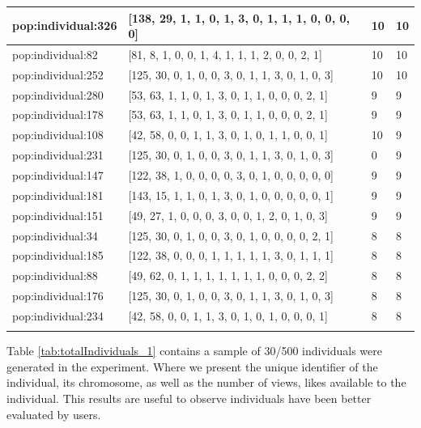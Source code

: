 \begin{table}
\begin{tabular}{p{3cm} p{4cm} p{3cm} p{3cm}}
\small{pop:individual:326} & \small{[138, 29, 1, 1, 0, 1, 3, 0, 1, 1, 1, 0, 0, 0, 0]}
& \small{10} & \small{10}\\ \hline
\small{pop:individual:82} & \small{[81, 8, 1, 0, 0, 1, 4, 1, 1, 1, 2, 0, 0, 2, 1]}
& \small{10} & \small{10}\\ \hline
\small{pop:individual:252} & \small{[125, 30, 0, 1, 0, 0, 3, 0, 1, 1, 3, 0, 1, 0, 3]}
& \small{10} & \small{10}\\ \hline
\small{pop:individual:280} & \small{[53, 63, 1, 1, 0, 1, 3, 0, 1, 1, 0, 0, 0, 2, 1]}
& \small{9} & \small{9}\\ \hline
\small{pop:individual:178} & \small{[53, 63, 1, 1, 0, 1, 3, 0, 1, 1, 0, 0, 0, 2, 1]}
& \small{9} & \small{9}\\ \hline
\small{pop:individual:108} & \small{[42, 58, 0, 0, 1, 1, 3, 0, 1, 0, 1, 1, 0, 0, 1]}
& \small{10} & \small{9}\\ \hline
\small{pop:individual:231} & \small{[125, 30, 0, 1, 0, 0, 3, 0, 1, 1, 3, 0, 1, 0, 3]}
& \small{0} & \small{9}\\ \hline
\small{pop:individual:147} & \small{[122, 38, 1, 0, 0, 0, 0, 3, 0, 1, 0, 0, 0, 0, 0]}
& \small{9} & \small{9}\\ \hline
\small{pop:individual:181} & \small{[143, 15, 1, 1, 0, 1, 3, 0, 1, 0, 0, 0, 0, 0, 1]}
& \small{9} & \small{9}\\ \hline
\small{pop:individual:151} & \small{[49, 27, 1, 0, 0, 0, 3, 0, 0, 1, 2, 0, 1, 0, 3]}
& \small{9} & \small{9}\\ \hline
\small{pop:individual:34} & \small{[125, 30, 0, 1, 0, 0, 3, 0, 1, 0, 0, 0, 0, 2, 1]}
& \small{8} & \small{8}\\ \hline
\small{pop:individual:185} & \small{[122, 38, 0, 0, 0, 1, 1, 1, 1, 1, 3, 0, 1, 1, 1]}
& \small{8} & \small{8}\\ \hline
\small{pop:individual:88} & \small{[49, 62, 0, 1, 1, 1, 1, 1, 1, 1, 0, 0, 0, 2, 2]}
& \small{8} & \small{8}\\ \hline
\small{pop:individual:176} & \small{[125, 30, 0, 1, 0, 0, 3, 0, 1, 1, 3, 0, 1, 0, 3]}
& \small{8} & \small{8}\\ \hline
\small{pop:individual:234} & \small{[42, 58, 0, 0, 1, 1, 3, 0, 1, 0, 1, 0, 0, 0, 1]}
& \small{8} & \small{8}\\ \hline
\noalign{\smallskip}\hline
\end{tabular}
\end{table}

Table \ref{tab:totalIndividuals_1} contains a sample of 30/500 individuals were
generated in the experiment. Where we present the unique identifier of the
individual, its chromosome, as well as the number of views, likes available to
the individual. This results are useful to observe individuals have been better
evaluated by users.

